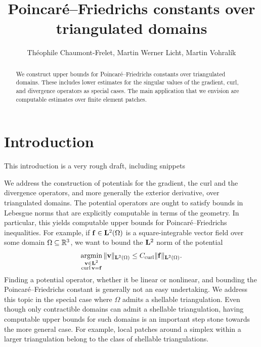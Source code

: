\documentclass[a4paper]{article}
\title{Poincar\'e--Friedrichs constants over triangulated domains}
\author{Th\'eophile Chaumont-Frelet, Martin Werner Licht, Martin Vohral\'ik}
\begin{document}
\maketitle

\begin{abstract}
    We construct upper bounds for Poincar\'e--Friedrichs constants over triangulated domains. 
    These includes lower estimates for the singular values of the gradient, curl, and divergence operators as special cases. 
    The main application that we envision are computable estimates over finite element patches. 
\end{abstract}


\section{Introduction}\label{section:intro}

{\color{red}This introduction is a very rough draft, including snippets}

We address the construction of potentials for the gradient, the curl and the divergence operators, and more generally the exterior derivative, over triangulated domains. The potential operators are ought to satisfy bounds in Lebesgue norms that are explicitly computable in terms of the geometry. 
In particular, this yields computable upper bounds for Poincar\'e--Friedrichs inequalities. 
For example, if ${\mathbf f} \in {\mathbf L}^{2}(\Omega)$ is a square-integrable vector field over some domain $\Omega \subseteq {\mathbb R}^3$, 
we want to bound the ${\mathbf L}^2$ norm of the potential
\begin{align*}
    \operatorname*{{\rm argmin}}\limits_{ \substack{ {\mathbf v} \in {\mathbf L}^{2} \\ \operatorname{curl} {\mathbf v} = {\mathbf f} } } \| {\mathbf v} \|_{{\mathbf L}^{2}(\Omega)}
    \leq 
    C_{\operatorname{curl}}
    \| {\mathbf f} \|_{{\mathbf L}^{2}(\Omega)}
    .
\end{align*}
Finding a potential operator, whether it be linear or nonlinear, and bounding the Poincar\'e--Friedrichs constant is generally not an easy undertaking. 
We address this topic in the special case where $\Omega$ admits a shellable triangulation.
Even though only contractible domains can admit a shellable triangulation, 
having computable upper bounds for such domains is an important step stone towards the more general case. 
For example, local patches around a simplex within a larger triangulation belong to the class of shellable triangulations.
\end{document}
